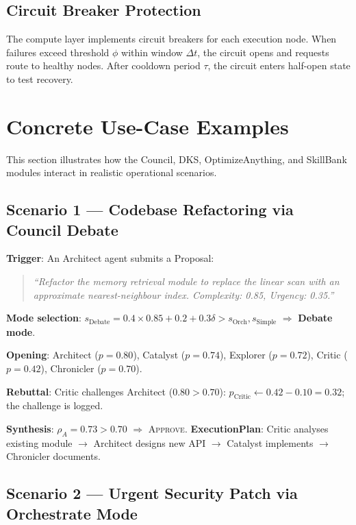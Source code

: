 \documentclass[11pt]{article}
\begin{document}
\subsection{Circuit Breaker Protection}

The compute layer implements circuit breakers for each execution node. When
failures exceed threshold $\phi$ within window $\Delta t$, the circuit opens
and requests route to healthy nodes. After cooldown period $\tau$, the circuit
enters half-open state to test recovery.

\section{Concrete Use-Case Examples}
\nopagebreak[4]
\label{sec:usecases}

This section illustrates how the Council, DKS, OptimizeAnything, and SkillBank
modules interact in realistic operational scenarios.

\subsection{Scenario 1 --- Codebase Refactoring via Council Debate}

\noindent\textbf{Trigger}: An Architect agent submits a Proposal:
\begin{quote}
\small\itshape
``Refactor the memory retrieval module to replace the linear scan with an
approximate nearest-neighbour index. Complexity: 0.85, Urgency: 0.35.''
\end{quote}

\noindent\textbf{Mode selection}: $s_{\text{Debate}} = 0.4 \times 0.85 + 0.2 +
0.3\delta > s_{\text{Orch}}, s_{\text{Simple}}$ $\Rightarrow$ \textbf{Debate mode}.

\noindent\textbf{Opening}: Architect ($p=0.80$), Catalyst ($p=0.74$), Explorer
($p=0.72$), Critic ($p=0.42$), Chronicler ($p=0.70$).

\noindent\textbf{Rebuttal}: Critic challenges Architect ($0.80 > 0.70$):
$p_{\text{Critic}} \leftarrow 0.42 - 0.10 = 0.32$; the challenge is logged.

\noindent\textbf{Synthesis}: $\rho_A = 0.73 > 0.70$ $\Rightarrow$
\textsc{Approve}. \textbf{ExecutionPlan}: Critic analyses existing module $\to$
Architect designs new API $\to$ Catalyst implements $\to$ Chronicler documents.

\subsection{Scenario 2 --- Urgent Security Patch via Orchestrate Mode}
\end{document}
